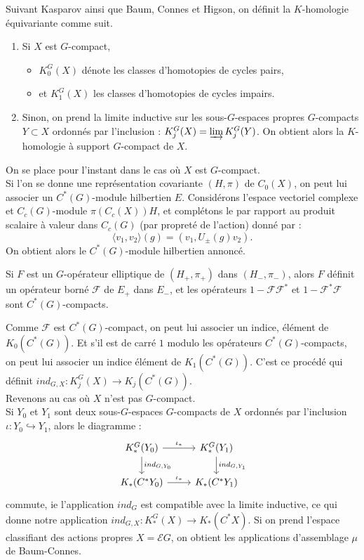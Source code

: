 \begin{definition}[$K$-homologie]
Suivant Kasparov ainsi que Baum, Connes et Higson, on définit la $K$-homologie équivariante comme suit.
\begin{enumerate}
\item Si $X$ est $G$-compact,
\begin{itemize}
\item $K_0^G(X)$ dénote les classes d'homotopies de cycles pairs,\\
\item et $K_1^G(X)$ les classes d'homotopies de cycles impairs.
\end{itemize}
\item Sinon, on prend la limite inductive sur les sous-$G$-espaces propres $G$-compacts $Y\subset X$ ordonnés par l'inclusion : $K^G_j(X)=\varinjlim K_j^G(Y)$. On obtient alors la $K$-homologie à support $G$-compact de $X$.
\end{enumerate}
\end{definition}
On se place pour l'instant dans le cas où $X$ est $G$-compact.\\
Si l'on se donne une représentation covariante $(H,\pi)$ de $C_0(X)$, on peut lui associer un $C^*(G)$-module hilbertien $E$. Considérons l'espace vectoriel complexe et $C_c(G)$-module $\pi(C_c(X))H$, et complétons le par rapport au produit scalaire à valeur dans $C_c(G)$ (par propreté de l'action) donné par :
\[\langle v_1,v_2\rangle ( g) =(v_1,U_\pm(g)v_2).\]
On obtient alors le $C^*(G)$-module hilbertien annoncé.


\begin{prop}
Si $F$ est un $G$-opérateur elliptique de $(H_+,\pi_+)$ dans $(H_-,\pi_-)$, alors $F$ définit un opérateur borné $\mathcal F$ de $E_+$ dans $E_-$, et les opérateurs $1-\mathcal F \mathcal F^*$ et $1-\mathcal F^*\mathcal F$ sont $C^*(G)$-compacts.
\end{prop}
 
Comme $\mathcal F$ est $C^*(G)$-compact, on peut lui associer un indice, élément de $K_0(C^*(G))$. Et s'il est de carré $1$ modulo les opérateurs $C^*(G)$-compacts, on peut lui associer un indice élément de $K_1(C^*(G))$. C'est ce procédé qui définit $ind_{G,X}: K_j^G(X)\rightarrow K_j(C^*(G))$.\\

Revenons au cas où $X$ n'est pas $G$-compact. \\
Si $Y_0$ et $Y_1$ sont deux sous-$G$-espaces $G$-compacts de $X$ ordonnés par l'inclusion $\iota : Y_0\hookrightarrow Y_1$, alors le diagramme :\\
\[
\begin{tikzcd}
K_*^G(Y_0)\arrow{r}{\iota_*} \arrow{d}{ind_{G,Y_0}} & K_*^G(Y_1) \arrow{d}{ind_{G,Y_1}}\\
K_*(C^*Y_0)\arrow{r}{\iota_*} & K_*(C^*Y_1)
\end{tikzcd}\]
commute, ie l'application $ind_G$ est compatible avec la limite inductive, ce qui donne notre application $ind_{G,X}:K^G_*(X)\rightarrow K_*(C^* X)$. Si on prend l'espace classifiant des actions propres $X=\mathcal E G$, on obtient les applications d'assemblage $\mu$ de Baum-Connes. \\

